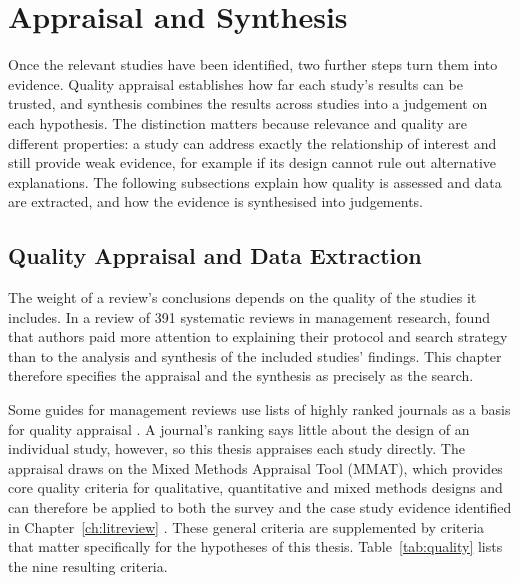 \section{Appraisal and Synthesis}
\label{sec:appsyn}

Once the relevant studies have been identified, two further steps turn them into evidence. Quality appraisal establishes how far each study's results can be trusted, and synthesis combines the results across studies into a judgement on each hypothesis. The distinction matters because relevance and quality are different properties: a study can address exactly the relationship of interest and still provide weak evidence, for example if its design cannot rule out alternative explanations. The following subsections explain how quality is assessed and data are extracted, and how the evidence is synthesised into judgements.

\subsection{Quality Appraisal and Data Extraction}
\label{sec:appraisal}

The weight of a review's conclusions depends on the quality of the studies it includes. In a review of 391 systematic reviews in management research, \textcite{rojon2021} found that authors paid more attention to explaining their protocol and search strategy than to the analysis and synthesis of the included studies' findings. This chapter therefore specifies the appraisal and the synthesis as precisely as the search.

Some guides for management reviews use lists of highly ranked journals as a basis for quality appraisal \parencite{kraus2020}. A journal's ranking says little about the design of an individual study, however, so this thesis appraises each study directly. The appraisal draws on the Mixed Methods Appraisal Tool (MMAT), which provides core quality criteria for qualitative, quantitative and mixed methods designs and can therefore be applied to both the survey and the case study evidence identified in Chapter~\ref{ch:litreview} \parencite{hong2018}. These general criteria are supplemented by criteria that matter specifically for the hypotheses of this thesis. Table~\ref{tab:quality} lists the nine resulting criteria.

